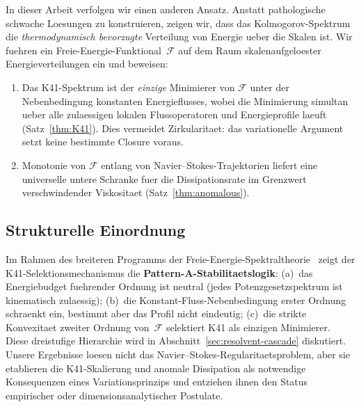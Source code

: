 \documentclass[12pt,a4paper]{article}
\theoremstyle{definition}
\theoremstyle{plain}
\theoremstyle{remark}
\begin{document}
In dieser Arbeit verfolgen wir einen anderen Ansatz. Anstatt pathologische
schwache Loesungen zu konstruieren, zeigen wir, dass das
Kolmogorov-Spektrum die \emph{thermodynamisch bevorzugte} Verteilung von
Energie ueber die Skalen ist. Wir fuehren ein
Freie-Energie-Funktional~$\mathcal{F}$ auf dem Raum skalenaufgeloester
Energieverteilungen ein und beweisen:
\begin{enumerate}
  \item Das K41-Spektrum ist der \emph{einzige} Minimierer von $\mathcal{F}$
        unter der Nebenbedingung konstanten Energieflusses, wobei die
        Minimierung simultan ueber alle zulaessigen lokalen Flussoperatoren
        und Energieprofile laeuft (Satz~\ref{thm:K41}). Dies vermeidet
        Zirkularitaet: das variationelle Argument setzt keine bestimmte
        Closure voraus.
  \item Monotonie von $\mathcal{F}$ entlang von Navier--Stokes-Trajektorien
        liefert eine universelle untere Schranke fuer die Dissipationsrate
        im Grenzwert verschwindender Viskositaet (Satz~\ref{thm:anomalous}).
\end{enumerate}

\subsection{Strukturelle Einordnung}

Im Rahmen des breiteren Programms der Freie-Energie-Spektraltheorie~\cite{FST-Unified2026}
zeigt der K41-Selektionsmechanismus die \textbf{Pattern-A-Stabilitaetslogik}:
(a)~das Energiebudget fuehrender Ordnung ist neutral (jedes
Potenzgesetzspektrum ist kinematisch zulaessig); (b)~die
Konstant-Fluss-Nebenbedingung erster Ordnung schraenkt ein, bestimmt aber
das Profil nicht eindeutig; (c)~die strikte Konvexitaet zweiter Ordnung
von~$\mathcal{F}$ selektiert K41 als einzigen Minimierer. Diese
dreistufige Hierarchie wird in Abschnitt~\ref{sec:resolvent-cascade}
diskutiert.
Unsere Ergebnisse loesen nicht das Navier--Stokes-Regularitaetsproblem,
aber sie etablieren die K41-Skalierung und anomale Dissipation als
notwendige Konsequenzen eines Variationsprinzips und entziehen ihnen den
Status empirischer oder dimensionsanalytischer Postulate.
\end{document}
